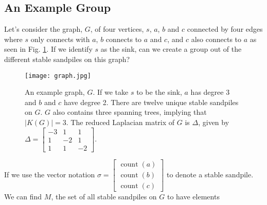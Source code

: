 \documentclass[12pt]{article}
\DeclareMathOperator{\ct}{count}
\begin{document}
\subsection{An Example Group}

Let's consider the graph, $G$, of four vertices, $s$, $a$, $b$ and $c$ connected by four edges where $s$ only connects with $a$, $b$ connects to $a$ and $c$, and $c$ also connects to $a$ as seen in Fig. \ref{fig:example}.  If we identify $s$ as the sink, can we create a group out of the different stable sandpiles on this graph? 

\begin{figure}
    \centering
    \texttt{[image: graph.jpg]}
    \caption{An example graph, $G$.  If we take $s$ to be the sink, $a$ has degree 3 and $b$ and $c$ have degree 2.  There are twelve unique stable sandpiles on $G$.  $G$ also contains three spanning trees, implying that $|K(G)|=3$.  The reduced Laplacian matrix of $G$ is $\Delta$, given by \\ $\Delta=\begin{bmatrix} -3 & 1 & 1 \\ 1 & -2 & 1 \\ 1 & 1 & -2 \end{bmatrix}.$}
    \label{fig:example}
\end{figure}

If we use the vector notation $\sigma = \begin{bmatrix} \ct(a) \\ \ct(b) \\ \ct(c)
\end{bmatrix}$ to denote a stable sandpile.  We can find $M$, the set of all stable sandpiles on $G$ to have elements
\end{document}
